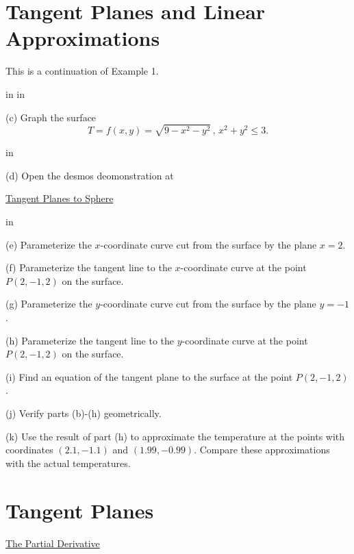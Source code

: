\documentclass{ximera}
\newcommand{\pskip}{\vskip 0.1 in}
\begin{document}
\section{Tangent Planes and Linear Approximations}


\begin{example}  \label{Esdtr435r}
This is a continuation of Example 1. 

\pskip \pskip

(c) Graph the surface
\[
  T = f(x,y) = \sqrt{9-x^2-y^2} \, , \, x^2 + y^2 \leq 3 .
\]

\pskip

(d) Open the desmos deomonstration at

\href{https://www.desmos.com/3d/d78d5a3138}{Tangent Planes to Sphere}

\pskip

(e) Parameterize the $x$-coordinate curve cut from the surface by the plane $x=2$.

(f) Parameterize the tangent line to the $x$-coordinate curve at the point $P(2,-1,2)$ on the surface.

(g) Parameterize the $y$-coordinate curve cut from the surface by the plane $y=-1$.

(h) Parameterize the tangent line to the $y$-coordinate curve at the point $P(2,-1,2)$ on the surface.

(i) Find an equation of the tangent plane to the surface at the point $P(2,-1,2)$.

(j) Verify parts (b)-(h) geometrically.

(k) Use the result of part (h) to approximate the temperature at the points with coordinates $(2.1, -1.1)$ and $(1.99, -0.99)$. Compare these approximations with the actual temperatures.

\end{example}



\section{Tangent Planes}
\begin{exploration}  \label{Edf754665}

 
\begin{onlineOnly}
    \begin{center}
\end{center}
\end{onlineOnly}


\href{https://www.desmos.com/calculator/y0h5kuvmbt}{The Partial Derivative}

\end{exploration}
\end{document}
